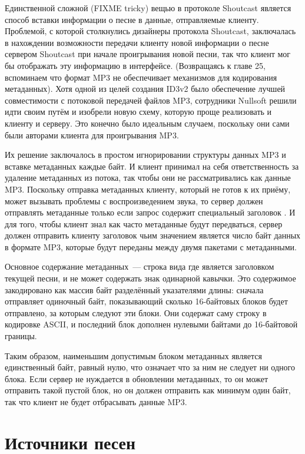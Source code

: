 Единственной сложной (FIXME tricky) вещью в протоколе Shoutcast является способ вставки
информации о песне в данные, отправляемые клиенту.  Проблемой, с которой столкнулись
дизайнеры протокола Shoutcast, заключалась в нахождении возможности передачи клиенту новой
информации о песне сервером Shoutcast при начале проигрывания новой песни, так что клиент
мог бы отображать эту информацию в интерфейсе. (Возвращаясь к главе 25, вспоминаем что
формат MP3 не обеспечивает механизмов для кодирования метаданных).  Хотя одной из целей
создания ID3v2 было обеспечение лучшей совместимости с потоковой передачей файлов MP3,
сотрудники Nullsoft решили идти своим путём и изобрели новую схему, которую проще
реализовать и клиенту и серверу.  Это конечно было идеальным случаем, поскольку они сами
были авторами клиента для проигрывания MP3.

Их решение заключалось в простом игнорировании структуры данных MP3 и вставке метаданных
каждые  байт.  И клиент принимал на себя ответственность за удаление метаданных из
потока, так чтобы они не рассматривались как данные MP3.  Поскольку отправка метаданных
клиенту, который не готов к их приёму, может вызывать проблемы с воспроизведением звука,
то сервер должен отправлять метаданные только если запрос содержит специальный заголовок
.  И для того, чтобы клиент знал как часто метаданные будут
передваться, сервер должен отправить клиенту заголовок  чьим значением
является число байт данных в формате MP3, которые будут переданы между двумя пакетами с
метаданными.

Основное содержание метаданных~--- строка вида  где 
является заголовком текущей песни, и не может содержать знак одинарной кавычки.  Это
содержимое закодировано как массив байт разделённый указателями длины: сначала отправляет
одиночный байт, показывающий сколько 16-байтовых блоков будет отправлено, за которым
следуют эти блоки.  Они содержат саму строку в кодировке ASCII, и последний блок дополнен
нулевыми байтами до 16-байтовой границы.

Таким образом, наименьшим допустимым блоком метаданных является единственный байт, равный
нулю, что означает что за ним не следует ни одного блока.  Если сервер не нуждается в
обновлении метаданных, то он может отправить такой пустой блок, но он должен отправить как
минимум один байт, так что клиент не будет отбрасывать данные MP3.

\section{Источники песен}

